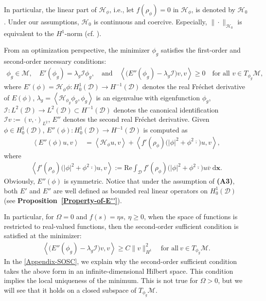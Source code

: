 \documentclass[preprint,3p]{elsarticle}
\begin{document}
In particular, the linear part of $\mathcal{H}_{\phi}$, i.e., let $f(\rho_{\phi})=0$ in $\mathcal{H}_{\phi}$, is denoted by $\mathcal{H}_{0}$.
Under our assumptions, $\mathcal{H}_0$ is continuous and coercive. Especially,  $\|\cdot\|_{\mathcal{H}_0}$ is equivalent to the $H^1$-norm (cf. \cite{2010A}).

From an optimization perspective, the minimizer $\phi_g$ satisfies the first-order and second-order necessary conditions:{
\begin{align}
	\phi_g \in \mathcal{M}, \quad 
	E'(\phi_g) = \lambda_g \mathcal{I} \phi_g, \quad \text{and} \quad 
	\left\langle \big(E''(\phi_g) - \lambda_g \mathcal{I}\big) v, v \right\rangle \ge 0 
	\quad \text{for all } v \in T_{\phi_g} \mathcal{M},
\end{align}}
where $E'(\phi)=\mathcal{H}_{\phi}\phi:H^1_0(\mathcal{D})\to H^{-1}(\mathcal{D})$ denotes the {real Fr\'echet derivative} of $E(\phi)$, $\lambda_g=\left\langle\mathcal{H}_{\phi_g}\phi_g,\phi_g\right\rangle$ is an eigenvalue with eigenfunction $\phi_g$, $\mathcal{I}: L^2(\mathcal{D})\to L^2(\mathcal{D})\subset H^{-1}(\mathcal{D})$ denotes the canonical identification $\mathcal{I}v:=(v,\cdot)_{L^2}$, $E''$ denotes the second real Fr\'echet derivative. Given $\phi\in H_0^1(\mathcal{D})$, \(E''(\phi):H_0^1(\mathcal{D})\to H^{-1}(\mathcal{D})\) is computed as
\begin{align}
	\left\langle E''(\phi)u,v\right\rangle&=\left\langle \mathcal{H}_{\phi}u,v\right\rangle+\left\langle f'(\rho_{\phi})\big(|\phi|^2+\phi^2\overline{\cdot}\big)u,v\right\rangle,
\end{align}
where 
\begin{align*}
	\left\langle f'(\rho_{\phi})\big(|\phi|^2+\phi^2\overline{\cdot}\big)u,v\right\rangle:=\text{Re}\int_{\mathcal{D}}f'(\rho_{\phi})\big(|\phi|^2+\phi^2\overline{\cdot}\big)u\overline{v}\;\text{d}\bm{x}.
\end{align*}
Obviously, $E''(\phi)$ is symmetric. Notice that under the assumption of {\bf (A3)}, both $E'$ and $E''$ are well defined as bounded real linear operators on $H_0^1(\mathcal{D})$ (see {\bf Proposition~\ref{Property-of-E''}}). 


In particular, for $\Omega=0$ and $f(s)=\eta s,\ \eta\ge0$, when the space of functions is restricted to real-valued functions, then the second-order sufficient condition is
satisfied at the minimizer:
\begin{align}\label{SOSC}
	\left\langle\big(E''(\phi_g)-\lambda_g\mathcal{I}\big)v,v\right\rangle\ge C\|v\|^2_{H^1}\quad \text{for all}\ v\in T_{\phi_g}\mathcal{M}.
\end{align}
In the \ref{Appendix-SOSC}, we explain why the second-order sufficient condition takes the above form in an infinite-dimensional Hilbert space. This condition implies the local uniqueness of the minimum. This is not true for $\Omega>0$, but we will see that it holds on a closed subspace of $T_{\phi_g}\mathcal{M}$.
\end{document}
